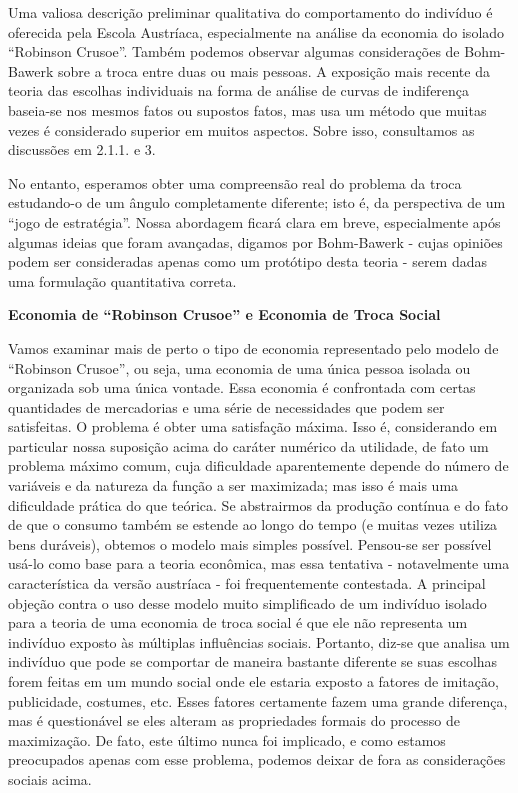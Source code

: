 \documentclass[12pt]{article}
\begin{document}
Uma valiosa descrição preliminar qualitativa do comportamento do indivíduo é oferecida pela Escola Austríaca, especialmente na análise da economia do isolado “Robinson Crusoe”. Também podemos observar algumas considerações de Bohm-Bawerk sobre a troca entre duas ou mais pessoas. A exposição mais recente da teoria das escolhas individuais na forma de análise de curvas de indiferença baseia-se nos mesmos fatos ou supostos fatos, mas usa um método que muitas vezes é considerado superior em muitos aspectos. Sobre isso, consultamos as discussões em 2.1.1. e 3.

No entanto, esperamos obter uma compreensão real do problema da troca estudando-o de um ângulo completamente diferente; isto é, da perspectiva de um “jogo de estratégia”. Nossa abordagem ficará clara em breve, especialmente após algumas ideias que foram avançadas, digamos por Bohm-Bawerk - cujas opiniões podem ser consideradas apenas como um protótipo desta teoria - serem dadas uma formulação quantitativa correta.

\textbf{Economia de “Robinson Crusoe” e Economia de Troca Social}

Vamos examinar mais de perto o tipo de economia representado pelo modelo de “Robinson Crusoe”, ou seja, uma economia de uma única pessoa isolada ou organizada sob uma única vontade. Essa economia é confrontada com certas quantidades de mercadorias e uma série de necessidades que podem ser satisfeitas. O problema é obter uma satisfação máxima. Isso é, considerando em particular nossa suposição acima do caráter numérico da utilidade, de fato um problema máximo comum, cuja dificuldade aparentemente depende do número de variáveis e da natureza da função a ser maximizada; mas isso é mais uma dificuldade prática do que teórica. Se abstrairmos da produção contínua e do fato de que o consumo também se estende ao longo do tempo (e muitas vezes utiliza bens duráveis), obtemos o modelo mais simples possível. Pensou-se ser possível usá-lo como base para a teoria econômica, mas essa tentativa - notavelmente uma característica da versão austríaca - foi frequentemente contestada. A principal objeção contra o uso desse modelo muito simplificado de um indivíduo isolado para a teoria de uma economia de troca social é que ele não representa um indivíduo exposto às múltiplas influências sociais. Portanto, diz-se que analisa um indivíduo que pode se comportar de maneira bastante diferente se suas escolhas forem feitas em um mundo social onde ele estaria exposto a fatores de imitação, publicidade, costumes, etc. Esses fatores certamente fazem uma grande diferença, mas é questionável se eles alteram as propriedades formais do processo de maximização. De fato, este último nunca foi implicado, e como estamos preocupados apenas com esse problema, podemos deixar de fora as considerações sociais acima.
\end{document}
